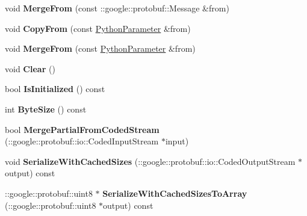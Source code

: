 \begin{DoxyCompactItemize}
void {\bfseries Merge\+From} (const \+::google\+::protobuf\+::\+Message \&from)
\item 
\mbox{\label{classcaffe_1_1_python_parameter_a52671b387b8149a0c17d22586c607451}} 
void {\bfseries Copy\+From} (const \mbox{\hyperlink{classcaffe_1_1_python_parameter}{Python\+Parameter}} \&from)
\item 
\mbox{\label{classcaffe_1_1_python_parameter_ae8893d93c497f6d267af486d51bae3e8}} 
void {\bfseries Merge\+From} (const \mbox{\hyperlink{classcaffe_1_1_python_parameter}{Python\+Parameter}} \&from)
\item 
\mbox{\label{classcaffe_1_1_python_parameter_a93d6630b4decce34bc7388d5f6ebc0df}} 
void {\bfseries Clear} ()
\item 
\mbox{\label{classcaffe_1_1_python_parameter_a19b5e36d6c8fa13e1c83b9a8957b83f2}} 
bool {\bfseries Is\+Initialized} () const
\item 
\mbox{\label{classcaffe_1_1_python_parameter_a6c28511ca28c4a70bb7aa3bd1e4a95d9}} 
int {\bfseries Byte\+Size} () const
\item 
\mbox{\label{classcaffe_1_1_python_parameter_ae2c5544258fbda1598ea32a25b14bd89}} 
bool {\bfseries Merge\+Partial\+From\+Coded\+Stream} (\+::google\+::protobuf\+::io\+::\+Coded\+Input\+Stream $\ast$input)
\item 
\mbox{\label{classcaffe_1_1_python_parameter_acb0583e5e3de3bc28ef7bee1b3cf72ac}} 
void {\bfseries Serialize\+With\+Cached\+Sizes} (\+::google\+::protobuf\+::io\+::\+Coded\+Output\+Stream $\ast$output) const
\item 
\mbox{\label{classcaffe_1_1_python_parameter_ada0b2585fda4fe1566d8aec055fb1bb6}} 
\+::google\+::protobuf\+::uint8 $\ast$ {\bfseries Serialize\+With\+Cached\+Sizes\+To\+Array} (\+::google\+::protobuf\+::uint8 $\ast$output) const
\item 
\mbox{\label{classcaffe_1_1_python_parameter_aea221e617b8db1b293efb35decdb4f79}} 

\end{DoxyCompactItemize}
